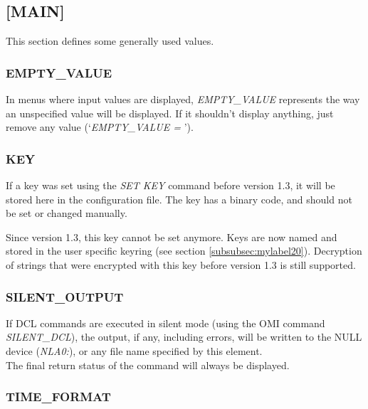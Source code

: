 \documentclass[a4paper]{book}
\newcommand{\vs}{\vspace{3mm}}
\begin{document}
\subsection{[MAIN]}
\label{subsubsec:mylabel16}

This section defines some generally used values.

\subsubsection{EMPTY{\_}VALUE}

In menus where input values are displayed, \linebreak\textsl{EMPTY{\_}VALUE} represents the 
way an unspecified value will be displayed. If it shouldn't display 
anything, just remove any value (`\textsl{EMPTY{\_}VALUE =} ').

\subsubsection{KEY}

If a key was set using the \textsl{SET KEY} command 
before version 1.3, it will be stored here in the configuration file. The 
key has a binary code, and should not be set or changed manually.

\vs

Since version 1.3, this key cannot be set anymore. Keys are now named and 
stored in the user specific keyring (see section \ref{subsubsec:mylabel20}). \newline
Decryption of strings that were encrypted  with this key before version 1.3 is
still supported.

\subsubsection{SILENT{\_}OUTPUT}

If DCL commands are executed in silent mode (using the OMI command 
\textsl{SILENT{\_}DCL}), the output, if any, 
including errors, will be written to the NULL device (\textsl{NLA0:}),
or any file name specified by this element. \\
The final return status of the command will always be displayed.

\subsubsection{TIME{\_}FORMAT}
\label{para:mylabel1}
\end{document}
